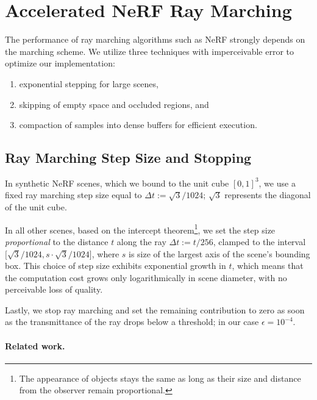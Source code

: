 \documentclass[acmtog,authorversion]{acmart}
\begin{document}

\section{Accelerated NeRF Ray Marching}\label{app:nerf-occupancy}

The performance of ray marching algorithms such as NeRF strongly depends on the marching scheme.
We utilize three techniques with imperceivable error to optimize our implementation:
\begin{enumerate}[leftmargin=*]
  \item exponential stepping for large scenes,
  \item skipping of empty space and occluded regions, and
  \item compaction of samples into dense buffers for efficient execution.
\end{enumerate}

\subsection{Ray Marching Step Size and Stopping}

In synthetic NeRF scenes, which we bound to the unit cube $[0,1]^3$, we use a fixed ray marching step size equal to ${\Delta t := \sqrt{3}/1024}$; $\sqrt{3}$ represents the diagonal of the unit cube.

In all other scenes, based on the intercept theorem\footnote{The appearance of objects stays the same as long as their size and distance from the observer remain proportional.}, we set the step size \emph{proportional} to the distance $t$ along the ray ${\Delta t := t / 256}$, clamped to the interval $\big[\sqrt{3}/1024, s \cdot \sqrt{3}/1024\big]$, where $s$ is size of the largest axis of the scene's bounding box.
This choice of step size exhibits exponential growth in $t$, which means that the computation cost grows only logarithmically in scene diameter, with no perceivable loss of quality.

Lastly, we stop ray marching and set the remaining contribution to zero as soon as the transmittance of the ray drops below a threshold; in our case ${\epsilon = 10^{-4}}$.

\paragraph{Related work.}
\end{document}
